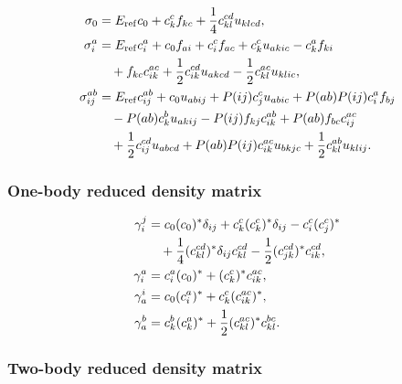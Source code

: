 \documentclass[11pt]{article}
\newcommand{\Eref}{E_{\mathrm{ref}}}
\begin{document}
\begin{align}
 \sigma_0
 &= \Eref c_0+c_k^c f_{kc}
    +\frac{1}{4}c_{kl}^{cd}u_{klcd},
 \\
 \sigma_i^a
 &= \Eref c_i^a+c_0f_{ai}+c_i^c f_{ac}
    +c_k^c u_{akic}-c_k^a f_{ki}
 \notag\\
 &\quad
    +f_{kc}c_{ik}^{ac}
    +\frac{1}{2}c_{ik}^{cd}u_{akcd}
    -\frac{1}{2}c_{kl}^{ac}u_{klic},
 \\
 \sigma_{ij}^{ab}
 &= \Eref c_{ij}^{ab}+c_0u_{abij}
    +P(ij)c_j^c u_{abic}
    +P(ab)P(ij)c_i^a f_{bj}
 \notag\\
 &\quad
    -P(ab)c_k^b u_{akij}
    -P(ij)f_{kj}c_{ik}^{ab}
    +P(ab)f_{bc}c_{ij}^{ac}
 \notag\\
 &\quad
    +\frac{1}{2}c_{ij}^{cd}u_{abcd}
    +P(ab)P(ij)c_{ik}^{ac}u_{bkjc}
    +\frac{1}{2}c_{kl}^{ab}u_{klij}.
\end{align}

\subsubsection{One-body reduced density matrix}

\begin{align}
 \gamma^j_i
 &= c_0(c_0)^*\delta_{ij}
    +c_k^c(c_k^c)^*\delta_{ij}
    -c_i^c(c_j^c)^*
 \notag\\
 &\quad
    +\frac{1}{4}(c_{kl}^{cd})^*\delta_{ij}c_{kl}^{cd}
    -\frac{1}{2}(c_{jk}^{cd})^*c_{ik}^{cd},
 \\
 \gamma^a_i
 &= c_i^a(c_0)^*+(c_k^c)^*c_{ik}^{ac},
 \\
 \gamma^i_a
 &= c_0(c_i^a)^*+c_k^c(c_{ik}^{ac})^*,
 \\
 \gamma^b_a
 &= c_k^b(c_k^a)^*
    +\frac{1}{2}(c_{kl}^{ac})^*c_{kl}^{bc}.
\end{align}

\subsubsection{Two-body reduced density matrix}
\end{document}
